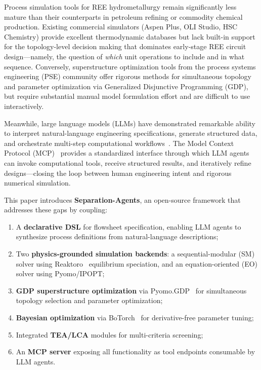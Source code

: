 \documentclass[11pt]{article}
\begin{document}
Process simulation tools for REE hydrometallurgy remain significantly less
mature than their counterparts in petroleum refining or commodity chemical
production.  Existing commercial simulators (Aspen Plus, OLI Studio, HSC
Chemistry) provide excellent thermodynamic databases but lack built-in
support for the topology-level decision making that dominates early-stage
REE circuit design---namely, the question of \emph{which} unit operations
to include and in what sequence.  Conversely, superstructure optimization
tools from the process systems engineering (PSE) community
\citep{yeomans1999systematic,grossmann2002review} offer rigorous methods
for simultaneous topology and parameter optimization via Generalized
Disjunctive Programming (GDP), but require substantial manual model
formulation effort and are difficult to use interactively.

Meanwhile, large language models (LLMs) have demonstrated remarkable
ability to interpret natural-language engineering specifications, generate
structured data, and orchestrate multi-step computational
workflows~\citep{kang2024quantitative}.  The Model Context Protocol
(MCP)~\citep{anthropic2024mcp} provides a standardized interface through
which LLM agents can invoke computational tools, receive structured
results, and iteratively refine designs---closing the loop between human
engineering intent and rigorous numerical simulation.

This paper introduces \textbf{Separation-Agents}, an open-source framework
that addresses these gaps by coupling:
\begin{enumerate}
  \item A \textbf{declarative DSL} for flowsheet specification, enabling
    LLM agents to synthesize process definitions from natural-language
    descriptions;
  \item Two \textbf{physics-grounded simulation backends}: a
    sequential-modular (SM) solver using Reaktoro~\citep{leal2015reaktoro}
    equilibrium speciation, and an equation-oriented (EO) solver using
    Pyomo/IPOPT;
  \item \textbf{GDP superstructure optimization}
    via Pyomo.GDP~\citep{chen2022pyomo} for simultaneous topology selection
    and parameter optimization;
  \item \textbf{Bayesian optimization} via BoTorch~\citep{balandat2020botorch}
    for derivative-free parameter tuning;
  \item Integrated \textbf{TEA/LCA} modules for multi-criteria screening;
  \item An \textbf{MCP server} exposing all functionality as tool endpoints
    consumable by LLM agents.
\end{enumerate}
\end{document}
